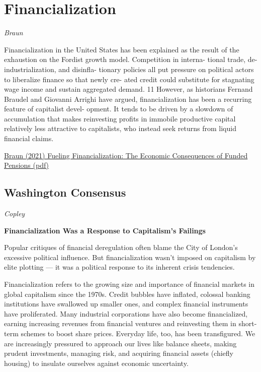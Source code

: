 \documentclass[
]{book}
\begin{document}
\hypertarget{financialization}{%
\chapter{Financialization}\label{financialization}}

\emph{Braun}

Financialization in the United States has been
explained as the result of the exhaustion on the
Fordist growth model. Competition in interna-
tional trade, de-industrialization, and disinfla-
tionary policies all put pressure on political
actors to liberalize finance so that newly cre-
ated credit could substitute for stagnating wage
income and sustain aggregated demand. 11
However, as historians Fernand Braudel and
Giovanni Arrighi have argued, financialization
has been a recurring feature of capitalist devel-
opment. It tends to be driven by a slowdown of
accumulation that makes reinvesting profits in
immobile productive capital relatively less
attractive to capitalists, who instead seek
returns from liquid financial claims.

\href{pdf/Braun_2021_Fueling_Financialization_Funded_Pensions.pdf}{Braun (2021) Fueling Financialization: The Economic Consequences of Funded Pensions (pdf)}

\hypertarget{washington-consensus}{%
\section{Washington Consensus}\label{washington-consensus}}

\emph{Copley}

\textbf{Financialization Was a Response to Capitalism's Failings}

Popular critiques of financial deregulation often blame the City of London's excessive political influence. But financialization wasn't imposed on capitalism by elite plotting --- it was a political response to its inherent crisis tendencies.

Financialization refers to the growing size and importance of financial markets in global capitalism since the 1970s. Credit bubbles have inflated, colossal banking institutions have swallowed up smaller ones, and complex financial instruments have proliferated. Many industrial corporations have also become financialized, earning increasing revenues from financial ventures and reinvesting them in short-term schemes to boost share prices. Everyday life, too, has been transfigured. We are increasingly pressured to approach our lives like balance sheets, making prudent investments, managing risk, and acquiring financial assets (chiefly housing) to insulate ourselves against economic uncertainty.
\end{document}
